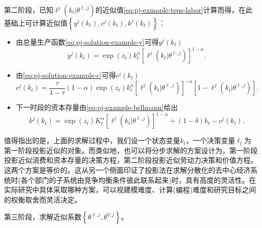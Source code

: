 第二阶段，已知$\ell^{j}\left( k_{t} | \theta^{\ell,j} \right)$的近似值\eqref{eq:pj-exmaple-teps-labor}计算而得，在此基础上可计算近似值$\left\{ y^{j} \left( k_{t} \right), c^{j} \left(k_{t} \right) , k^{j} \left( k_{t} \right) \right\}$：
\begin{itemize}
\item 由总量生产函数\eqref{eq:pj-solution-example-y}可得$y^{j} \left( k_{t} \right)$
\begin{equation}
  \label{eq:pj-solution-example-y-approx}
  y^{j} \left( k_{t} \right) = \exp \left( z_{t} \right) k_{t}^{\alpha}
  \left[
  \ell^{j} \left( k_{t} | \theta^{\ell,j} \right)
  \right]^{1 - \alpha}.
\end{equation}
\item 由\eqref{eq:pj-solution-example-c}可得$c^{j} \left( k_{t} \right)$
\begin{equation}
  \label{eq:pj-solution-example-c-approx}
  c^{j} \left( k_{t} \right) =
  \frac{\tau}{1-\tau} \left(1 - \alpha \right)
  \exp \left( z_{t} \right) k_{t}^{\alpha}
  \left[ \ell^{j} \left( k_{t} | \theta^{\ell,j} \right) \right]^{- \alpha}
  \left[ 1 - \ell^{j} \left( k_{t} | \theta^{\ell,j} \right) \right].
\end{equation}
\item 下一时段的资本存量由\eqref{eq:pj-example-bellmann}给出
\begin{equation}
  \label{eq:pj-solution-example-knext-approx}
  k^{j} \left(k_{t} \right) =
  \exp \left( z_{t} \right) K_{t}^{\alpha}
  \left[ \ell^{j} \left( k_{t} | \theta^{\ell,j} \right) \right]^{1-\alpha}
  + \left( 1 - \delta \right) k_{t} - c^{j} \left( k_{t} \right).
\end{equation}
\end{itemize}

\label{footnote:pj-solution-approximation-tradeoff}
值得指出的是，上面的求解过程中，我们设一个状态变量$k_{t}$，一个决策变量$\ell_{t}$为第一阶段投影近似的对象。而类似地，也可以将分步求解的方案设计为，第一阶段投影近似消费和资本存量的决策方程，第二阶段投影近似劳动力决策和价值方程。这两个方案是等价的。这从另一个侧面印证了投影法在求解分散化的去中心经济系统时(各个部门的子系统由竞争均衡条件彼此联系起来)时，具有高度的灵活性。在实际研究中具体采取哪种方案，可以视建模难度、计算(编程)难度和研究目标之间的权衡取舍而灵活决定。

第三阶段，求解近似系数$\left\{ \theta^{\ell,j}, \theta^{V,j} \right\}$。


